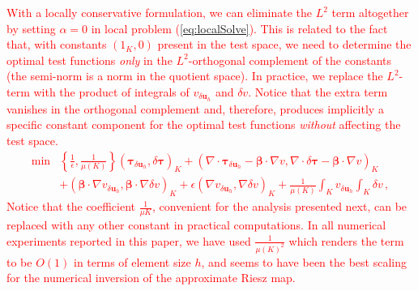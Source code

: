 \documentclass[letterpaper]{article}
\def\btau{\boldsymbol\tau}
\def\bbeta{\boldsymbol\beta}
\newcommand{\bs}[1]{\boldsymbol{#1}}
\newcommand{\vdeltau}{v_{\delta\bs u_h}}
\newcommand{\taudeltau}{\btau_{\delta\bs u_h}}
\newcommand{\red}[1]{\textcolor{red}{#1}}
\begin{document}
\red{
With a locally conservative formulation, we can eliminate the $L^2$ term altogether
by setting $\alpha = 0$ in local problem (\ref{eq:localSolve}). This is related to the fact that,
with constants $(1_K,0)$ present in the test space, we need to determine
the optimal test functions {\em only} in the $L^2$-orthogonal complement of the
constants (the semi-norm is  a norm in the quotient space). In practice, we replace
the $L^2$-term with the product of integrals of $\vdeltau$ and $\delta v$.
Notice that the extra term vanishes in the orthogonal complement and, therefore,
produces implicitly a specific constant component for the optimal test functions
{\em without} affecting the test space.
\begin{align}
\label{eq:localSolveMod}
\min&\left\{\frac{1}{\epsilon},\frac{1}{\mu(K)}\right\}(\taudeltau,\delta\btau)_K
+(\nabla\cdot\taudeltau-\bbeta\cdot\nabla
v,\nabla\cdot\delta\btau-\bbeta\cdot\nabla v)_K\\
&+(\bbeta\cdot\nabla\vdeltau,\bbeta\cdot\nabla \delta v)_K\nonumber
+\epsilon(\nabla\vdeltau,\nabla \delta v)_K
+\frac{1}{\mu(K)}\int_K\vdeltau\int_K\delta v\,,
\end{align}
Notice that the coefficient $\frac{1}{\mu{K}}$, convenient for the analysis 
presented next, can be replaced with any other constant in practical computations.
In all numerical experiments reported in this paper, we have used $\frac{1}{\mu(K)^2}$
which renders the term to be $O(1)$ in terms of element size $h$, and seems to have been
the best scaling for the numerical inversion of the approximate Riesz map.
}

\end{document}
